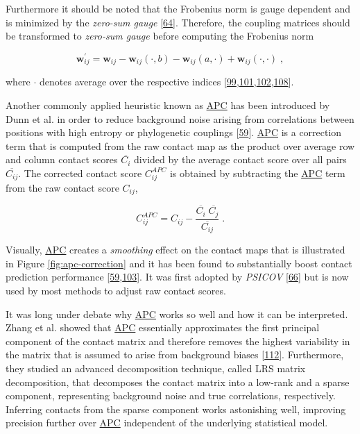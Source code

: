 \documentclass[11pt,a4paper,twoside]{book}
\newcommand{\w}{\mathbf{w}}
\newcommand{\wij}{\mathbf{w}_{ij}}
\theoremstyle{definition}
\theoremstyle{definition}
\theoremstyle{remark}
\begin{document}
Furthermore it should be noted that the Frobenius norm is gauge
dependent and is minimized by the \emph{zero-sum gauge}
{[}\protect\hyperlink{ref-Weigt2009}{64}{]}. Therefore, the coupling
matrices should be transformed to \emph{zero-sum gauge} before computing
the Frobenius norm

\begin{equation}
    \w^{\prime}_{ij}  = \wij - \wij(\cdot, b) - \wij(a, \cdot) + \wij(\cdot, \cdot) \; ,
\label{eq:zero-sum-gauge-transform}
\end{equation}

where \(\cdot\) denotes average over the respective indices
{[}\protect\hyperlink{ref-Ekeberg2013}{99},\protect\hyperlink{ref-Seemayer2014}{101},\protect\hyperlink{ref-Ekeberg2014}{102},\protect\hyperlink{ref-Baldassi2014}{108}{]}.

Another commonly applied heuristic known as
\protect\hyperlink{abbrev}{APC} has been introduced by Dunn et al. in
order to reduce background noise arising from correlations between
positions with high entropy or phylogenetic couplings
{[}\protect\hyperlink{ref-Dunn2008}{59}{]}.
\protect\hyperlink{abbrev}{APC} is a correction term that is computed
from the raw contact map as the product over average row and column
contact scores \(\overline{C_i}\) divided by the average contact score
over all pairs \(\overline{C_{ij}}\). The corrected contact score
\(C_{ij}^{APC}\) is obtained by subtracting the
\protect\hyperlink{abbrev}{APC} term from the raw contact score
\(C_{ij}\),

\begin{equation}
    C_{ij}^{APC}  = C_{ij} - \frac{\overline{C_i} \; \overline{C_j}}{\overline{C_{ij}}}\; .
\label{eq:apc}
\end{equation}

Visually, \protect\hyperlink{abbrev}{APC} creates a \emph{smoothing}
effect on the contact maps that is illustrated in Figure
\ref{fig:apc-correction} and it has been found to substantially boost
contact prediction performance
{[}\protect\hyperlink{ref-Dunn2008}{59},\protect\hyperlink{ref-Kamisetty2013}{103}{]}.
It was first adopted by \emph{PSICOV}
{[}\protect\hyperlink{ref-Jones2012}{66}{]} but is now used by most
methods to adjust raw contact scores.

It was long under debate why \protect\hyperlink{abbrev}{APC} works so
well and how it can be interpreted. Zhang et al. showed that
\protect\hyperlink{abbrev}{APC} essentially approximates the first
principal component of the contact matrix and therefore removes the
highest variability in the matrix that is assumed to arise from
background biases {[}\protect\hyperlink{ref-Zhang2016}{112}{]}.
Furthermore, they studied an advanced decomposition technique, called
LRS matrix decomposition, that decomposes the contact matrix into a
low-rank and a sparse component, representing background noise and true
correlations, respectively.\\
Inferring contacts from the sparse component works astonishing well,
improving precision further over \protect\hyperlink{abbrev}{APC}
independent of the underlying statistical model.
\end{document}
